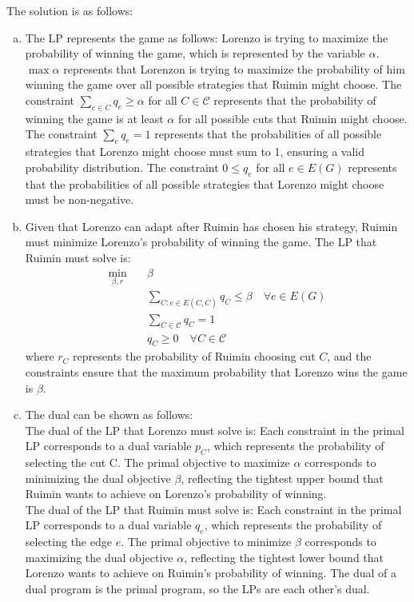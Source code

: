 \documentclass[10pt]{article}
\begin{document}
\begin{solution}
The solution is as follows:
\begin{enumerate} [(a)]
    \item The LP represents the game as follows: Lorenzo is trying to maximize the probability of winning the game, which is represented by the variable $\alpha$. $\max{\alpha}$ represents that Lorenzon is trying to maximize the probability of him winning the game over all possible strategies that Ruimin might choose. The constraint $\sum_{e \in C} q_e \geq \alpha$ for all $C \in \mathcal{C}$ represents that the probability of winning the game is at least $\alpha$ for all possible cuts that Ruimin might choose. The constraint $\sum_e q_e = 1$ represents that the probabilities of all possible strategies that Lorenzo might choose must sum to 1, ensuring a valid probability distribution. The constraint $0 \leq q_e$ for all $e \in E(G)$ represents that the probabilities of all possible strategies that Lorenzo might choose must be non-negative.
    \item Given that Lorenzo can adapt after Ruimin has chosen his strategy, Ruimin must minimize Lorenzo's probability of winning the game. The LP that Ruimin must solve is: 
    \begin{align*}
        \min_{\beta, r}\quad&  \beta\\
        &\sum_{C: e \in E(C, \overline{C})} q_C \leq \beta \quad \forall e \in E(G)\\
        &\sum_{C \in \mathcal{C}} q_C = 1\\
        &q_C \geq 0 \quad \forall C \in \mathcal{C}
    \end{align*}
    where $r_C$ represents the probability of Ruimin choosing cut $C$, and the constraints ensure that the maximum probability that Lorenzo wins the game is $\beta$.
    \item The dual can be shown as follows: \\
    The dual of the LP that Lorenzo must solve is: Each constraint in the primal LP corresponds to a dual variable $p_C$, which represents the probability of selecting the cut C. The primal objective to maximize $\alpha$ corresponds to minimizing the dual objective $\beta$, reflecting the tightest upper bound that Ruimin wants to achieve on Lorenzo's probability of winning. \\
    The dual of the LP that Ruimin must solve is: Each constraint in the primal LP corresponds to a dual variable $q_e$, which represents the probability of selecting the edge $e$. The primal objective to minimize $\beta$ corresponds to maximizing the dual objective $\alpha$, reflecting the tightest lower bound that Lorenzo wants to achieve on Ruimin's probability of winning. The dual of a dual program is the primal program, so the LPs are each other's dual.

\end{enumerate}
\end{solution}
\end{document}
